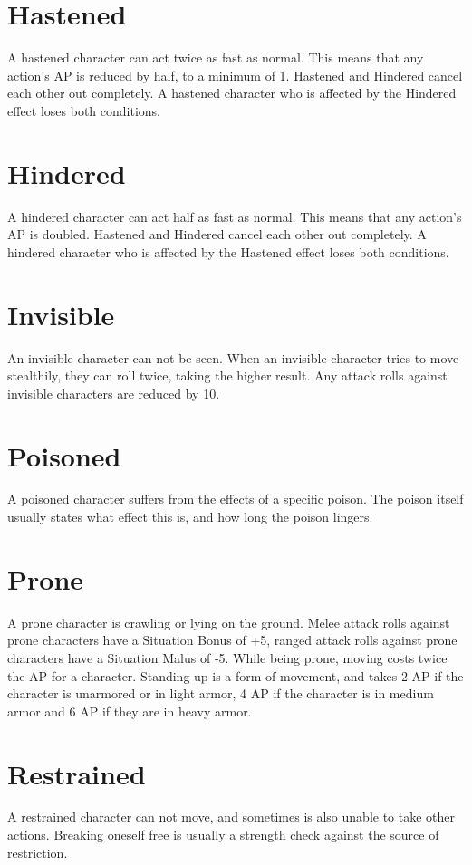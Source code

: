 \section{Hastened}\label{condition:hastened}
A hastened character can act twice as fast as normal.
This means that any action's AP is reduced by half, to a minimum of 1.
Hastened and Hindered cancel each other out completely.
A hastened character who is affected by the Hindered effect loses both conditions.

\section{Hindered}\label{condition:hindered}
A hindered character can act half as fast as normal.
This means that any action's AP is doubled.
Hastened and Hindered cancel each other out completely.
A hindered character who is affected by the Hastened effect loses both conditions.

\section{Invisible}\label{condition:invisible}
An invisible character can not be seen.
When an invisible character tries to move stealthily, they can roll twice, taking the higher result.
Any attack rolls against invisible characters are reduced by 10.

\section{Poisoned}\label{condition:poisoned}
A poisoned character suffers from the effects of a specific poison.
The poison itself usually states what effect this is, and how long the poison lingers.

\section{Prone}\label{condition:prone}
A prone character is crawling or lying on the ground.
Melee attack rolls against prone characters have a Situation Bonus of +5, ranged attack rolls against prone characters have a Situation Malus of -5.
While being prone, moving costs twice the AP for a character.
Standing up is a form of movement, and takes 2 AP if the character is unarmored or in light armor, 4 AP if the character is in medium armor and 6 AP if they are in heavy armor.

\section{Restrained}\label{condition:restrained}
A restrained character can not move, and sometimes is also unable to take other actions.
Breaking oneself free is usually a strength check against the source of restriction.

